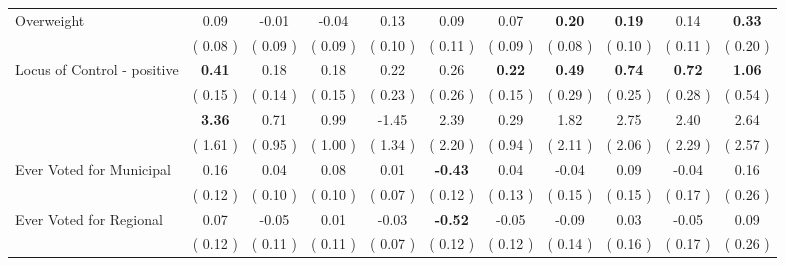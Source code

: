 \begin{tabular}{l c c c c c c c c c c}
Overweight &      0.09 &     -0.01 &     -0.04 &      0.13 &      0.09 &      0.07 & \textbf{      0.20 } & \textbf{      0.19 } &      0.14 & \textbf{     0.33} \\
& (     0.08 ) & (     0.09 ) & (     0.09 ) & (     0.10 ) & (     0.11 ) & (     0.09 ) & (     0.08 ) & (     0.10 ) & (     0.11 ) & (     0.20 ) \\
Locus of Control - positive & \textbf{      0.41 } &      0.18 &      0.18 &      0.22 &      0.26 & \textbf{     0.22} & \textbf{      0.49 } & \textbf{      0.74 } & \textbf{      0.72 } & \textbf{     1.06} \\
& (     0.15 ) & (     0.14 ) & (     0.15 ) & (     0.23 ) & (     0.26 ) & (     0.15 ) & (     0.29 ) & (     0.25 ) & (     0.28 ) & (     0.54 ) \\
& \textbf{      3.36 } &      0.71 &      0.99 &     -1.45 &      2.39 &      0.29 &      1.82 &      2.75 &      2.40 &      2.64 \\
& (     1.61 ) & (     0.95 ) & (     1.00 ) & (     1.34 ) & (     2.20 ) & (     0.94 ) & (     2.11 ) & (     2.06 ) & (     2.29 ) & (     2.57 ) \\
Ever Voted for Municipal &      0.16 &      0.04 &      0.08 &      0.01 & \textbf{     -0.43 } &      0.04 &     -0.04 &      0.09 &     -0.04 &      0.16 \\
& (     0.12 ) & (     0.10 ) & (     0.10 ) & (     0.07 ) & (     0.12 ) & (     0.13 ) & (     0.15 ) & (     0.15 ) & (     0.17 ) & (     0.26 ) \\
Ever Voted for Regional &      0.07 &     -0.05 &      0.01 &     -0.03 & \textbf{     -0.52 } &     -0.05 &     -0.09 &      0.03 &     -0.05 &      0.09 \\
& (     0.12 ) & (     0.11 ) & (     0.11 ) & (     0.07 ) & (     0.12 ) & (     0.12 ) & (     0.14 ) & (     0.16 ) & (     0.17 ) & (     0.26 ) \\
\bottomrule
\end{tabular}
